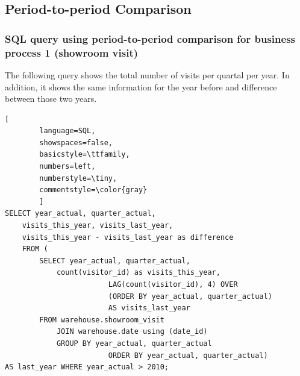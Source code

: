 \documentclass[letterpaper,12pt]{article}
\begin{document}
\subsection{Period-to-period Comparison}

\subsubsection{SQL query using period-to-period comparison for business process 1 (showroom visit)}

The following query shows the total number of visits per quartal per year. In addition, it shows the same information for the year before and difference between those two years.

\begin{lstlisting}[
        language=SQL,
        showspaces=false,
        basicstyle=\ttfamily,
        numbers=left,
        numberstyle=\tiny,
        commentstyle=\color{gray}
        ]
SELECT year_actual, quarter_actual, 
	visits_this_year, visits_last_year,
	visits_this_year - visits_last_year as difference
	FROM (
		SELECT year_actual, quarter_actual,
			count(visitor_id) as visits_this_year,
                        LAG(count(visitor_id), 4) OVER 
                        (ORDER BY year_actual, quarter_actual) 
                        AS visits_last_year 
		FROM warehouse.showroom_visit
			JOIN warehouse.date using (date_id)
			GROUP BY year_actual, quarter_actual
                        ORDER BY year_actual, quarter_actual) 
AS last_year WHERE year_actual > 2010;
\end{lstlisting}
\end{document}
